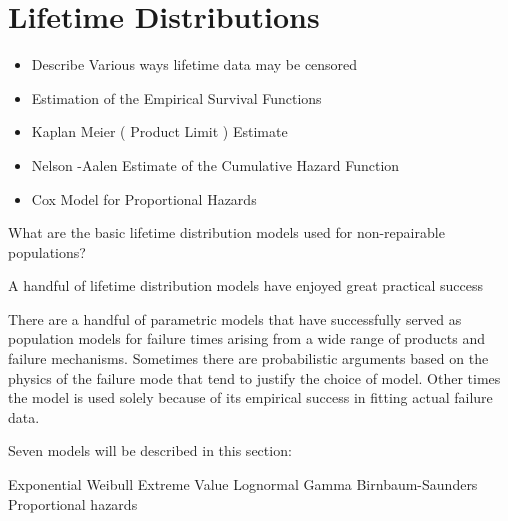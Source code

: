 \section*{Lifetime Distributions}
\begin{itemize}

\item Describe Various ways lifetime data may be censored

\item Estimation of the Empirical Survival Functions

\item Kaplan Meier ( Product Limit ) Estimate

\item Nelson -Aalen Estimate of the Cumulative Hazard Function

\item Cox Model for Proportional Hazards

\end{itemize}
What are the basic lifetime distribution models used for non-repairable populations?

A handful of lifetime distribution models have enjoyed great practical success	

There are a handful of parametric models that have successfully served as population models for failure times arising from a wide range of products and failure mechanisms. Sometimes there are probabilistic arguments based on the physics of the failure mode that tend to justify the choice of model. Other times the model is used solely because of its  empirical success in fitting actual failure data. 

Seven models will be described in this section: 

Exponential
Weibull
Extreme Value 
Lognormal
Gamma 
Birnbaum-Saunders
Proportional hazards
